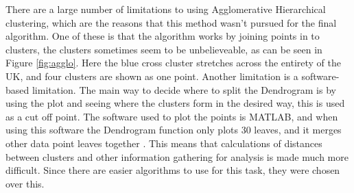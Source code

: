 \documentclass[a4paper]{article}
\begin{document}
There are a large number of limitations to using Agglomerative Hierarchical clustering, which are the reasons that this method wasn't pursued for the final algorithm. One of these is that the algorithm works by joining points in to clusters, the clusters sometimes seem to be unbelieveable, as can be seen in Figure \ref{fig:agglo}. Here the blue cross cluster stretches across the entirety of the UK, and four clusters are shown as one point. Another limitation is a software-based limitation. The main way to decide where to split the Dendrogram is by using the plot and seeing where the clusters form in the desired way, this is used as a cut off point. The software used to plot the points is MATLAB, and when using this software the Dendrogram function only plots 30 leaves, and it merges other data point leaves together \cite{dendrogram}. This means that calculations of distances between clusters and other information gathering for analysis is made much more difficult. Since there are easier algorithms to use for this task, they were chosen over this.
\end{document}
